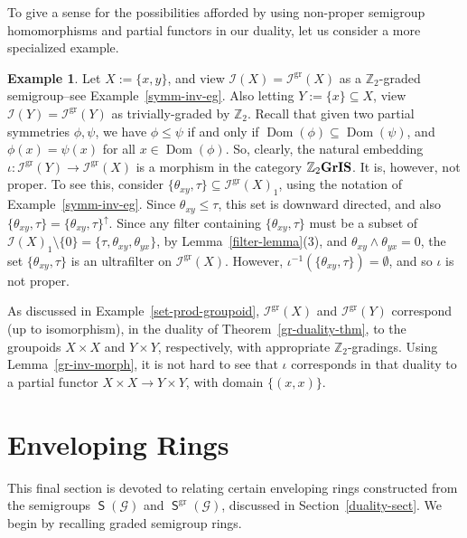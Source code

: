 \documentclass[a4paper,reqno,12pt]{amsart}
\numberwithin{equation}{section}
\theoremstyle{plain}
\theoremstyle{definition}
\newtheorem{example}[thm]{Example}
\newcommand{\dom}{\operatorname{Dom}}
\newcommand{\gr}{\operatorname{gr}}
\newcommand{\SG}{\operatorname{\mathsf{S}}}
\def \Z{\mathbb Z}
\begin{document}
To give a sense for the possibilities afforded by using non-proper semigroup homomorphisms and partial functors in our duality, let us consider a more specialized example.

\begin{example} \label{morph-eg}
Let $X := \{x,y\}$, and view $\mathcal{I}(X) = \mathcal{I}^{\gr}(X)$ as a $\Z_2$-graded semigroup--see Example~\ref{symm-inv-eg}. Also letting $Y := \{x\} \subseteq X$, view $\mathcal{I}(Y) = \mathcal{I}^{\gr}(Y)$ as trivially-graded by $\Z_2$. Recall that given two partial symmetries $\phi, \psi$, we have  $\phi \leq \psi$ if and only if $\dom(\phi) \subseteq \dom(\psi)$, and $\phi(x)=\psi(x)$ for all $x \in \dom(\phi)$. So, clearly, the natural embedding $\iota : \mathcal{I}^{\gr}(Y) \to \mathcal{I}^{\gr}(X)$ is a morphism in the category $\Z_2\bf{GrIS}$. It is, however, not proper. To see this, consider $\{\theta_{xy},\tau\} \subseteq \mathcal{I}^{\gr}(X)_1$, using the notation of Example~\ref{symm-inv-eg}. Since $\theta_{xy} \leq \tau$, this set is downward directed, and also $\{\theta_{xy},\tau\} = \{\theta_{xy},\tau\}^{\uparrow}$. Since any filter containing $\{\theta_{xy},\tau\}$ must be a subset of $\mathcal{I}(X)_1 \setminus \{0\} = \{\tau, \theta_{xy}, \theta_{yx}\}$, by Lemma~\ref{filter-lemma}(3), and $\theta_{xy} \land \theta_{yx} = 0$, the set $\{\theta_{xy},\tau\}$ is an ultrafilter on $\mathcal{I}^{\gr}(X)$. However, $\iota^{-1}(\{\theta_{xy},\tau\}) = \emptyset$, and so $\iota$ is not proper.

As discussed in Example~\ref{set-prod-groupoid}, $\mathcal{I}^{\gr}(X)$ and $\mathcal{I}^{\gr}(Y)$ correspond (up to isomorphism), in the duality of Theorem~\ref{gr-duality-thm}, to the groupoids $X \times X$ and $Y \times Y$, respectively, with appropriate $\Z_2$-gradings. Using Lemma~\ref{gr-inv-morph}, it is not hard to see that $\iota$ corresponds in that duality to a partial functor $X \times X \to Y \times Y$, with domain $\{(x,x)\}$.
\end{example}

\section{Enveloping Rings} \label{rings-sect}

This final section is devoted to relating certain enveloping rings constructed from the semigroups $\SG(\mathscr{G})$ and $\SG^{\gr}(\mathscr{G})$, discussed in Section~\ref{duality-sect}. We begin by recalling graded semigroup rings.
\end{document}

